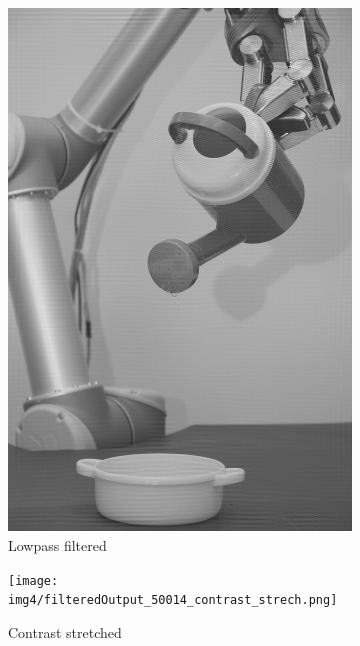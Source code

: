 \begin{figure}[H]
\begin{subfigure}[b]{0.24\textwidth}
        \includegraphics[width=\textwidth]{img4/Image4_2.png}
        \caption{Lowpass filtered}
        \label{fig:img2_src}
    \end{subfigure}
    \begin{subfigure}[b]{0.24\textwidth}
        \texttt{[image: img4/filteredOutput\_50014\_contrast\_strech.png]}
        \caption{Contrast stretched}
        \label{fig:img2_hist}
    \end{subfigure}	
\begin{subfigure}[b]{0.24\textwidth}

\end{subfigure}
\end{figure}
